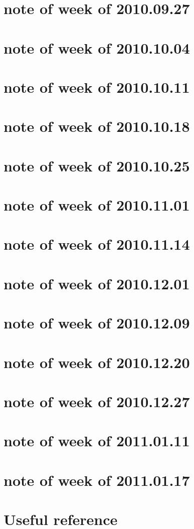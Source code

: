 \documentclass{article}
\begin{document}
\section{note of week of 2010.09.27}

\section{note of week of 2010.10.04}

\section{note of week of 2010.10.11}

\section{note of week of 2010.10.18}

\section{note of week of 2010.10.25}

\section{note of week of 2010.11.01}

\section{note of week of 2010.11.14}

\section{note of week of 2010.12.01}

\section{note of week of 2010.12.09}

\section{note of week of 2010.12.20}

\section{note of week of 2010.12.27}


\section{note of week of 2011.01.11}



\section{note of week of 2011.01.17}


\appendix
\section{Useful reference}

\printindex

%

\end{document}
